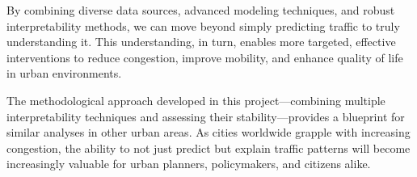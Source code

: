 \documentclass[
  letterpaper,
  DIV=11,
  numbers=noendperiod]{scrreprt}
\begin{document}
By combining diverse data sources, advanced modeling techniques, and
robust interpretability methods, we can move beyond simply predicting
traffic to truly understanding it. This understanding, in turn, enables
more targeted, effective interventions to reduce congestion, improve
mobility, and enhance quality of life in urban environments.

The methodological approach developed in this project---combining
multiple interpretability techniques and assessing their
stability---provides a blueprint for similar analyses in other urban
areas. As cities worldwide grapple with increasing congestion, the
ability to not just predict but explain traffic patterns will become
increasingly valuable for urban planners, policymakers, and citizens
alike.
\end{document}
